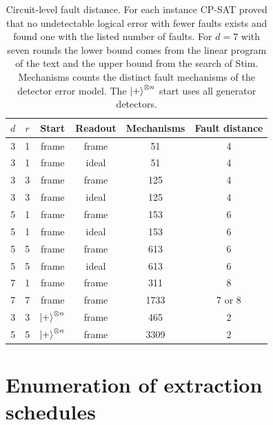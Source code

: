 \begin{table}[t]
  \caption{Circuit-level fault distance. For each instance CP-SAT proved that no undetectable logical error with fewer faults exists and found one with the listed number of faults. For $d=7$ with seven rounds the lower bound comes from the linear program of the text and the upper bound from the search of Stim. Mechanisms counts the distinct fault mechanisms of the detector error model. The $\left|+\right\rangle^{\otimes n}$ start uses all generator detectors.}
  \label{tab:fdapp}
  \begin{ruledtabular}
  \begin{tabular}{cccccc}
    $d$ & $r$ & Start & Readout & Mechanisms & Fault distance \\
    \hline
    3 & 1 & frame & frame & 51 & 4 \\
    3 & 1 & frame & ideal & 51 & 4 \\
    3 & 3 & frame & frame & 125 & 4 \\
    3 & 3 & frame & ideal & 125 & 4 \\
    5 & 1 & frame & frame & 153 & 6 \\
    5 & 1 & frame & ideal & 153 & 6 \\
    5 & 5 & frame & frame & 613 & 6 \\
    5 & 5 & frame & ideal & 613 & 6 \\
    7 & 1 & frame & frame & 311 & 8 \\
    7 & 7 & frame & frame & 1733 & 7 or 8 \\
    3 & 3 & $\left|+\right\rangle^{\otimes n}$ & frame & 465 & 2 \\
    5 & 5 & $\left|+\right\rangle^{\otimes n}$ & frame & 3309 & 2 \\
  \end{tabular}
  \end{ruledtabular}
\end{table}

\section{Enumeration of extraction schedules}
\label{app:schedule}

